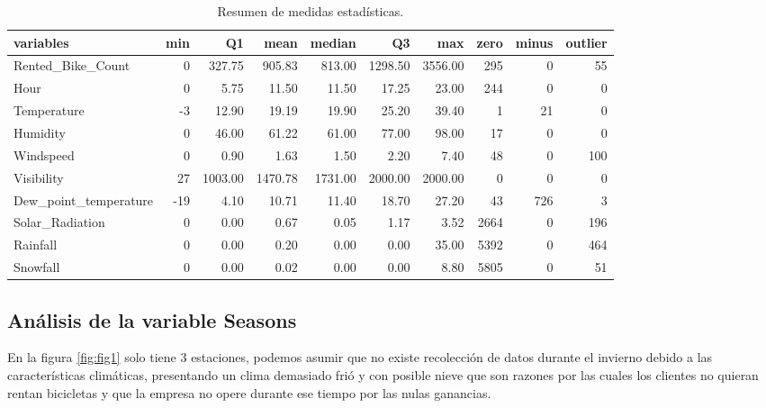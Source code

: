 \documentclass[]{elsarticle} %
\begin{document}
\begin{table}

\caption{\label{tab:tab1}\label{tab:tab1}Resumen de medidas estadísticas.}
\centering
\begin{tabular}[t]{l|r|r|r|r|r|r|r|r|r}
\hline
variables & min & Q1 & mean & median & Q3 & max & zero & minus & outlier\\
\hline
Rented\_Bike\_Count & 0 & 327.75 & 905.83 & 813.00 & 1298.50 & 3556.00 & 295 & 0 & 55\\
\hline
Hour & 0 & 5.75 & 11.50 & 11.50 & 17.25 & 23.00 & 244 & 0 & 0\\
\hline
Temperature & -3 & 12.90 & 19.19 & 19.90 & 25.20 & 39.40 & 1 & 21 & 0\\
\hline
Humidity & 0 & 46.00 & 61.22 & 61.00 & 77.00 & 98.00 & 17 & 0 & 0\\
\hline
Windspeed & 0 & 0.90 & 1.63 & 1.50 & 2.20 & 7.40 & 48 & 0 & 100\\
\hline
Visibility & 27 & 1003.00 & 1470.78 & 1731.00 & 2000.00 & 2000.00 & 0 & 0 & 0\\
\hline
Dew\_point\_temperature & -19 & 4.10 & 10.71 & 11.40 & 18.70 & 27.20 & 43 & 726 & 3\\
\hline
Solar\_Radiation & 0 & 0.00 & 0.67 & 0.05 & 1.17 & 3.52 & 2664 & 0 & 196\\
\hline
Rainfall & 0 & 0.00 & 0.20 & 0.00 & 0.00 & 35.00 & 5392 & 0 & 464\\
\hline
Snowfall & 0 & 0.00 & 0.02 & 0.00 & 0.00 & 8.80 & 5805 & 0 & 51\\
\hline
\end{tabular}
\end{table}

\subsection{Análisis de la variable Seasons}

En la figura \ref{fig:fig1} solo tiene 3 estaciones, podemos asumir que
no existe recolección de datos durante el invierno debido a las
características climáticas, presentando un clima demasiado frió y con
posible nieve que son razones por las cuales los clientes no quieran
rentan bicicletas y que la empresa no opere durante ese tiempo por las
nulas ganancias.
\end{document}

